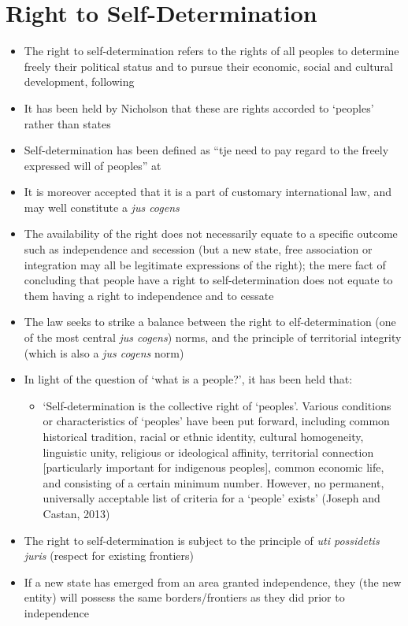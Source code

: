 \section{Right to Self-Determination}
\begin{itemize}
    \item The right to self-determination refers to the rights of all peoples to determine freely their political status and to pursue their economic, social and cultural development, following 
    \item It has been held by Nicholson that these are rights accorded to `peoples' rather than states
    \item Self-determination has been defined as ``tje need to pay regard to the freely expressed will of peoples'' at 
    \item It is moreover accepted that it is a part of customary international law, and may well constitute a \textit{jus cogens}
    \item The availability of the right does not necessarily equate to a specific outcome such as independence and secession (but a new state, free association or integration may all be legitimate expressions of the right); the mere fact of concluding that people have a right to self-determination does not equate to them having a right to independence and to cessate
    \item The law seeks to strike a balance between the right to elf-determination (one of the most central \textit{jus cogens}) norms, and the principle of territorial integrity (which is also a \textit{jus cogens} norm)
    \item In light of the question of `what is a people?', it has been held that:
    \begin{itemize}
        \item `Self-determination is the collective right of `peoples'. Various conditions or characteristics of `peoples' have been put forward, including common historical tradition, racial or ethnic identity, cultural homogeneity, linguistic unity, religious or ideological affinity, territorial connection [particularly important for indigenous peoples], common economic life, and consisting of a certain minimum number. However, no permanent, universally acceptable list of criteria for a `people' exists' (Joseph and Castan, 2013)
    \end{itemize}
    \item The right to self-determination is subject to the principle of \textit{uti possidetis juris} (respect for existing frontiers)
    \item If a new state has emerged from an area granted independence, they (the new entity) will possess the same borders/frontiers as they did prior to independence
\end{itemize}

